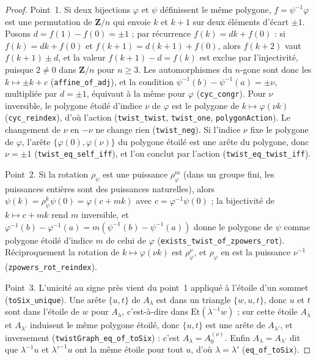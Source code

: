 \begin{proof}
Point~1. Si deux bijections $\varphi$ et $\psi$ définissent le même polygone, $f = \psi^{-1}\varphi$ est une permutation de $\mathbf Z/n$ qui envoie $k$ et $k + 1$ sur deux éléments d'écart $\pm 1$. Posons $d = f(1) - f(0) = \pm 1$ ; par récurrence $f(k) = dk + f(0)$ : si $f(k) = dk + f(0)$ et $f(k + 1) = d(k + 1) + f(0)$, alors $f(k + 2)$ vaut $f(k + 1) \pm d$, et la valeur $f(k + 1) - d = f(k)$ est exclue par l'injectivité, puisque $2 \neq 0$ dans $\mathbf Z/n$ pour $n \geq 3$. Les automorphismes du $n$-gone sont donc les $k \mapsto \pm k + c$ (\texttt{affine\_of\_adj}), et la condition $\psi^{-1}(b) - \psi^{-1}(a) = \pm\nu$, multipliée par $d = \pm 1$, équivaut à la même pour $\varphi$ (\texttt{cyc\_congr}). Pour $\nu$ inversible, le polygone étoilé d'indice $\nu$ de $\varphi$ est le polygone de $k \mapsto \varphi(\nu k)$ (\texttt{cyc\_reindex}), d'où l'action (\texttt{twist\_twist}, \texttt{twist\_one}, \texttt{polygonAction}). Le changement de $\nu$ en $-\nu$ ne change rien (\texttt{twist\_neg}). Si l'indice $\nu$ fixe le polygone de $\varphi$, l'arête $\{\varphi(0), \varphi(\nu)\}$ du polygone étoilé est une arête du polygone, donc $\nu = \pm 1$ (\texttt{twist\_eq\_self\_iff}), et l'on conclut par l'action (\texttt{twist\_eq\_twist\_iff}).

Point~2. Si la rotation $\rho_\psi$ est une puissance $\rho_\varphi^m$ (dans un groupe fini, les puissances entières sont des puissances naturelles), alors $\psi(k) = \rho_\psi^k\psi(0) = \varphi(c + mk)$ avec $c = \varphi^{-1}\psi(0)$ ; la bijectivité de $k \mapsto c + mk$ rend $m$ inversible, et $\varphi^{-1}(b) - \varphi^{-1}(a) = m(\psi^{-1}(b) - \psi^{-1}(a))$ donne le polygone de $\psi$ comme polygone étoilé d'indice $m$ de celui de $\varphi$ (\texttt{exists\_twist\_of\_zpowers\_rot}). Réciproquement la rotation de $k \mapsto \varphi(\nu k)$ est $\rho_\varphi^\nu$, et $\rho_\varphi$ en est la puissance $\nu^{-1}$ (\texttt{zpowers\_rot\_reindex}).

Point~3. L'unicité au signe près vient du point~1 appliqué à l'étoile d'un sommet (\texttt{toSix\_unique}). Une arête $\{u, t\}$ de $A_\lambda$ est dans un triangle $\{w, u, t\}$, donc $u$ et $t$ sont dans l'étoile de $w$ pour $A_\lambda$, c'est-à-dire dans $\mathrm{Et}(\lambda^{-1}w)$ ; sur cette étoile $A_\lambda$ et $A_{\lambda'}$ induisent le même polygone étoilé, donc $\{u, t\}$ est une arête de $A_{\lambda'}$, et inversement (\texttt{twistGraph\_eq\_of\_toSix}) : c'est $A_\lambda = A_0^{(\nu)}$. Enfin $A_\lambda = A_{\lambda'}$ dit que $\lambda^{-1}u$ et $\lambda'^{-1}u$ ont la même étoile pour tout $u$, d'où $\lambda = \lambda'$ (\texttt{eq\_of\_toSix}).


\end{proof}
